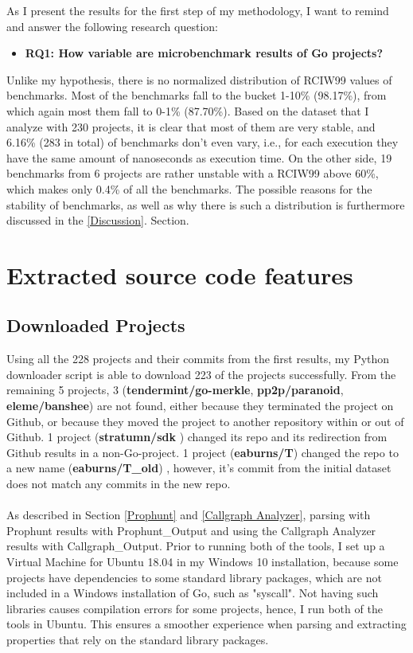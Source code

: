 \documentclass{seal_thesis}
\begin{document}
\noindent As I present the results for the first step of my methodology, I want to remind and answer the following research question:

\begin{itemize}
	\item \textbf{RQ1: How variable are microbenchmark results of Go projects?}
\end{itemize}

\noindent Unlike my hypothesis, there is no normalized distribution of RCIW99 values of benchmarks. Most of the benchmarks fall to the bucket 1-10\% (98.17\%), from which again most them fall to 0-1\% (87.70\%). Based on the dataset that I analyze with 230 projects, it is clear that most of them are very stable, and 6.16\% (283 in total) of benchmarks don't even vary, i.e., for each execution they have the same amount of nanoseconds as execution time. On the other side, 19 benchmarks from 6 projects are rather unstable with a RCIW99 above 60\%, which makes only 0.4\% of all the benchmarks. The possible reasons for the stability of benchmarks, as well as why there is such a distribution is furthermore discussed in the \ref{Discussion}. Section.


\section{Extracted source code features}
\label{Extracted source code features}

\subsection{Downloaded Projects}
Using all the 228 projects and their commits from the first results, my Python downloader script is able to download 223 of the projects successfully. From the remaining 5 projects, 3 (\textbf{tendermint/go-merkle}, \textbf{pp2p/paranoid}, \textbf{eleme/banshee}) are not found, either because they terminated the project on Github, or because they moved the project to another repository within or out of Github. 1 project (\textbf{stratumn/sdk} \cite{stratumn/sdk}) changed its repo and its redirection from Github results in a non-Go-project. 1 project (\textbf{eaburns/T}) changed the repo to a new name (\textbf{eaburns/T\_old}) \cite{eaburns/T_old}, however, it's commit from the initial dataset does not match any commits in the new repo.\\
\\
As described in Section \ref{Prophunt} and \ref{Callgraph Analyzer}, parsing with Prophunt results with Prophunt\_Output and using the Callgraph Analyzer results with Callgraph\_Output. Prior to running both of the tools, I set up a Virtual Machine for Ubuntu 18.04 in my Windows 10 installation, because some projects have dependencies to some standard library packages, which are not included in a Windows installation of Go, such as "syscall". Not having such libraries causes compilation errors for some projects, hence, I run both of the tools in Ubuntu. This ensures a smoother experience when parsing and extracting properties that rely on the standard library packages.\\
\end{document}
